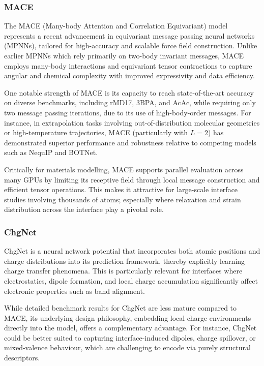 \subsubsection{MACE}

The MACE (Many-body Attention and Correlation Equivariant) model represents a recent advancement in equivariant message
passing neural networks (MPNNs), tailored for high-accuracy and scalable force field construction. Unlike earlier MPNNs
which rely primarily on two-body invariant messages, MACE employs many-body interactions and equivariant tensor
contractions to capture angular and chemical complexity with improved expressivity and data efficiency.

One notable strength of MACE is its capacity to reach state-of-the-art accuracy on diverse benchmarks, including rMD17,
3BPA, and AcAc, while requiring only two message passing iterations, due to its use of high-body-order messages. For
instance, in extrapolation tasks involving out-of-distribution molecular geometries or high-temperature trajectories,
MACE (particularly with $L=2$) has demonstrated superior performance and robustness relative to competing models such as
NequIP and BOTNet.

Critically for materials modelling, MACE supports parallel evaluation across many GPUs by limiting its receptive field
through local message construction and efficient tensor operations. This makes it attractive for large-scale interface
studies involving thousands of atoms; especially where relaxation and strain distribution across the interface play a
pivotal role.

\subsubsection{ChgNet}

ChgNet is a neural network potential that incorporates both atomic positions and charge distributions into its
prediction framework, thereby explicitly learning charge transfer phenomena. This is particularly relevant for
interfaces where electrostatics, dipole formation, and local charge accumulation significantly affect electronic
properties such as band alignment.

While detailed benchmark results for ChgNet are less mature compared to MACE, its underlying design philosophy,
embedding local charge environments directly into the model, offers a complementary advantage. For instance, ChgNet
could be better suited to capturing interface-induced dipoles, charge spillover, or mixed-valence behaviour, which are
challenging to encode via purely structural descriptors.

